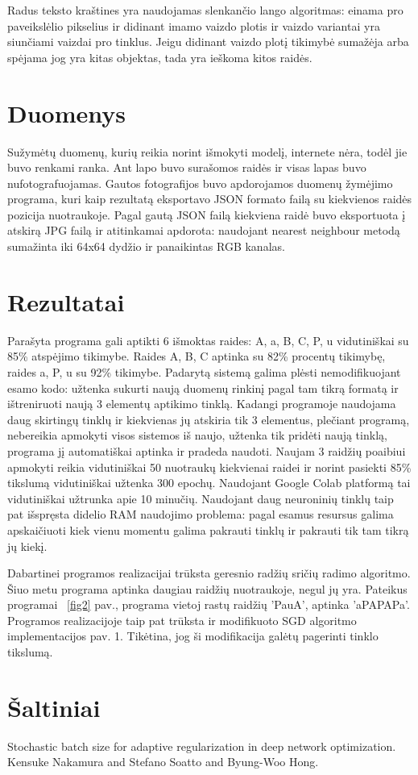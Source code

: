 \documentclass[conference]{IEEEtran}
\begin{document}
\par
Radus teksto kraštines yra naudojamas slenkančio lango algoritmas: einama
pro paveikslėlio pikselius ir didinant imamo vaizdo plotis ir vaizdo variantai yra
 siunčiami vaizdai pro
tinklus. Jeigu didinant vaizdo plotį tikimybė sumažėja arba spėjama jog yra kitas
objektas, tada yra ieškoma kitos raidės.

\section{Duomenys}

Sužymėtų duomenų, kurių reikia norint išmokyti modelį, internete nėra, todėl
jie buvo renkami ranka. Ant lapo buvo surašomos raidės ir visas lapas buvo
nufotografuojamas. Gautos fotografijos buvo apdorojamos duomenų žymėjimo programa,
kuri kaip rezultatą eksportavo JSON formato failą su kiekvienos raidės pozicija
nuotraukoje. Pagal gautą JSON failą kiekviena raidė buvo eksportuota į atskirą JPG
failą ir atitinkamai apdorota: naudojant nearest neighbour metodą sumažinta iki
64x64 dydžio ir panaikintas RGB kanalas.

\section{Rezultatai}

Parašyta programa gali aptikti 6 išmoktas raides: A, a, B, C, P, u vidutiniškai su
85\% atspėjimo tikimybe. Raides A, B, C aptinka su 82\% procentų tikimybę, raides a, P, u
su 92\% tikimybe. Padarytą sistemą galima plėsti nemodifikuojant esamo kodo:
užtenka sukurti naują duomenų rinkinį pagal tam tikrą formatą ir ištreniruoti naują
3 elementų aptikimo tinklą. Kadangi programoje naudojama daug skirtingų tinklų ir kiekvienas
jų atskiria tik 3 elementus, plečiant programą, nebereikia apmokyti visos sistemos iš naujo,
užtenka tik pridėti naują tinklą, programa jį automatiškai aptinka ir pradeda naudoti.
Naujam 3 raidžių poaibiui apmokyti reikia vidutiniškai 50 nuotraukų kiekvienai raidei ir
norint pasiekti 85\% tikslumą vidutiniškai užtenka 300 epochų. Naudojant Google Colab
platformą tai vidutiniškai užtrunka apie 10 minučių. Naudojant daug neuroninių tinklų
taip pat išspręsta didelio RAM naudojimo problema: pagal esamus resursus galima
apskaičiuoti kiek vienu momentu galima pakrauti tinklų ir pakrauti tik tam tikrą jų
kiekį.
\par
Dabartinei programos realizacijai trūksta geresnio radžių sričių radimo algoritmo.
Šiuo metu programa aptinka daugiau raidžių nuotraukoje, negul jų yra. Pateikus
programai ~\ref{fig2} pav., programa vietoj rastų raidžių 'PauA', aptinka 'aPAPAPa'.
Programos realizacijoje taip pat trūksta ir modifikuoto SGD algoritmo implementacijos pav. 1. Tikėtina, jog ši modifikacija galėtų pagerinti
tinklo tikslumą.

\printbibliography

\section{Šaltiniai}
\par
[1] Stochastic batch size for adaptive regularization in deep network optimization. Kensuke Nakamura and Stefano Soatto and Byung-Woo Hong. 
\end{document}
